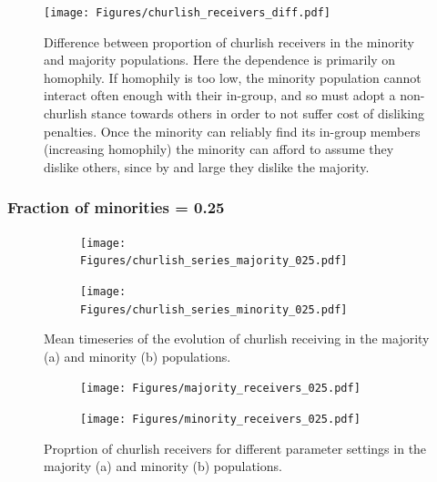 \documentclass[11pt,letterpaper]{article}
\begin{document}
\begin{figure}[H]
  \centering
    \texttt{[image: Figures/churlish\_receivers\_diff.pdf]}
  \caption{Difference between proportion of churlish receivers in the minority 
    and majority populations. Here the dependence is primarily on homophily.
    If homophily is too low, the minority population cannot interact often
    enough with their in-group, and so must adopt a non-churlish stance towards
    others in order to not suffer cost of disliking penalties. Once the minority
    can reliably find its in-group members (increasing homophily) the minority
    can afford to assume they dislike others, since by and large they dislike
    the majority.
  }
  \label{fig:}
\end{figure}


\subsubsection{Fraction of minorities = 0.25}

\begin{figure}[H]
  \centering
  \begin{subfigure}{0.49\textwidth}
    \centering
    \texttt{[image: Figures/churlish\_series\_majority\_025.pdf]}
    \caption{}
    \label{fig:}
  \end{subfigure}
  \begin{subfigure}{0.49\textwidth}
    \centering
    \texttt{[image: Figures/churlish\_series\_minority\_025.pdf]}
    \caption{}
    \label{fig:}
  \end{subfigure}
  \caption{Mean timeseries of the evolution of churlish receiving in the
    majority (a) and minority (b) populations.}
  \label{fig:regressions}
\end{figure}


\begin{figure}[H]
  \centering
  \begin{subfigure}{0.49\textwidth}
    \centering
    \texttt{[image: Figures/majority\_receivers\_025.pdf]}
    \caption{}
    \label{fig:}
  \end{subfigure}
  \begin{subfigure}{0.49\textwidth}
    \centering
    \texttt{[image: Figures/minority\_receivers\_025.pdf]}
    \caption{}
    \label{fig:}
  \end{subfigure}
  \caption{Proprtion of churlish receivers for different parameter settings in the
    majority (a) and minority (b) populations.}
  \label{fig:regressions}
\end{figure}
\end{document}
